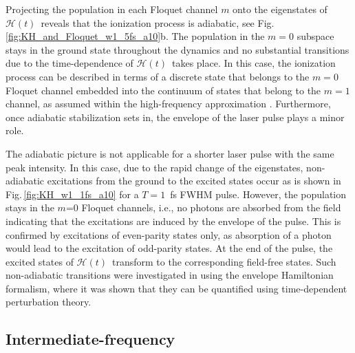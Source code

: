 \documentclass[
pra%
,preprint%
,amssymb, nobibnotes, aps, superscriptaddress, floatfix]{revtex4}
\newcommand{\fig}{Fig.\,}
\newcommand{\CAHt}{$\mathcal{H}(t)$}
\begin{document}
Projecting the population in each Floquet channel $m$ onto the eigenstates of \CAHt\ reveals that the ionization process is adiabatic, see \fig \ref{fig:KH_and_Floquet_w1_5fs_a10}b.
The population in the $m=0$ subspace stays in the ground state throughout the dynamics and no substantial transitions due to the time-dependence of \CAHt\ takes place.
In this case, the ionization process can be described in terms of a discrete state that belongs to  the $m=0$ Floquet channel embedded into the continuum of states that belong to the $m=1$ channel, as assumed within the high-frequency approximation \cite{Marinescu1996}. Furthermore, once adiabatic stabilization sets in, the envelope of the laser pulse plays a minor role.

The adiabatic picture is not applicable for a shorter laser pulse with the same peak intensity. In this case, due to the rapid change of the eigenstates, non-adiabatic excitations from the ground to the excited states occur as is shown in \fig \ref{fig:KH_w1_1fs_a10} for a $T=1$~fs FWHM pulse. However, the population stays in the $m$=0 Floquet channels, i.e., no photons are absorbed from the field indicating that the excitations are induced by the envelope of the pulse. This is confirmed by excitations of even-parity states only, as absorption of a photon would lead to the excitation of odd-parity states. At the end of the pulse, the excited states of \CAHt\ transform to the corresponding field-free states. Such non-adiabatic transitions \cite{Toyota2009} were investigated in \cite{Toyota} using the envelope Hamiltonian formalism, where it was shown that they can be quantified using time-dependent perturbation theory.


\subsection{Intermediate-frequency} \label{sec:mid_freq}
\end{document}
